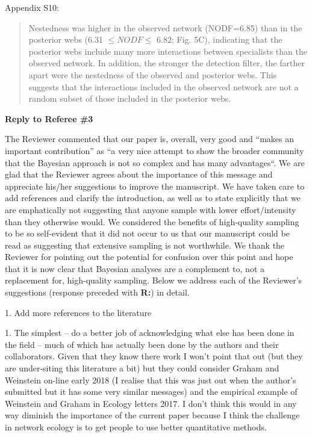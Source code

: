 \documentclass[12pt]{letter}
\newenvironment{refquote}{\bigskip \begin{it}}{\end{it}\smallskip}
\begin{document}
		Appendix S10:


		\begin{quotation}
			Nestedness was higher in the observed network (NODF=6.85) than in the posterior webs (6.31 $\leq NODF \leq$ 6.82; Fig. 5C), indicating that the posterior webs include many more interactions between specialists than the observed network. In addition, the stronger the detection filter, the farther apart were the nestedness of the observed and posterior webs. This suggests that the interactions included in the observed network are not a random subset of those included in the posterior webs.
		\end{quotation}

\clearpage

{\Large \bf Reply to Referee \#3}

	The Reviewer commented that our paper is, overall, very good and ``makes an important contribution'' as ``a very nice attempt to show the broader community that the Bayesian approach is not so complex and has many advantages``. We are glad that the Reviewer agrees about the importance of this message and appreciate his/her suggestions to improve the manuscript. We have taken care to add references and clarify the introduction, as well as to state explicitly that we are emphatically not suggesting that anyone sample with lower effort/intensity than they otherwise would. We considered the benefits of high-quality sampling to be so self-evident that it did not occur to us that our manuscript could be read as suggesting that extensive sampling is not worthwhile. We thank the Reviewer for pointing out the potential for confusion over this point and hope that it is now clear that Bayesian analyses are a complement to, not a replacement for, high-quality sampling. Below we address each of the Reviewer's suggestions (response preceded with \textbf{R:}) in detail.


	1. Add more references to the literature


		\begin{refquote}
		1.      The simplest – do a better job of acknowledging what else has been done in the field – much of which has actually been done by the authors and their collaborators.  Given that they know there work I won't point that out (but they are under-siting this literature a bit) but they could consider Graham and Weinstein on-line early 2018 (I realise that this was just out when the author's submitted but it has some very similar messages) and the empirical example of Weinstein and Graham in Ecology letters 2017.  I don't think this would in any way diminish the importance of the current paper because I think the challenge in network ecology is to get people to use better quantitative methods.
		\end{refquote}
\end{document}
